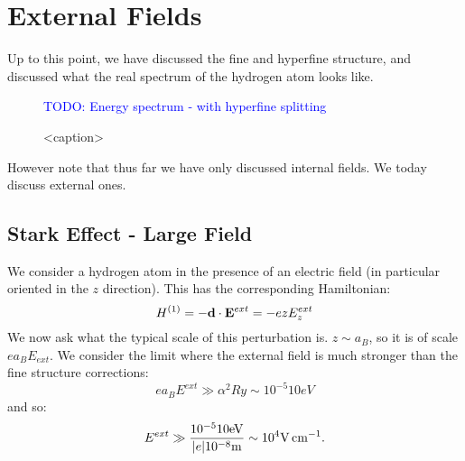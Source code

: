 \section{External Fields}
Up to this point, we have discussed the fine and hyperfine structure, and discussed what the real spectrum of the hydrogen atom looks like.

\begin{figure}[htbp]
    \centering
    \textcolor{blue}{TODO: Energy spectrum - with hyperfine splitting}
    \caption{<caption>}
    \label{<label>}
\end{figure}

However note that thus far we have only discussed internal fields. We today discuss external ones.

\subsection{Stark Effect - Large Field}
We consider a hydrogen atom in the presence of an electric field (in particular oriented in the $z$ direction). This has the corresponding Hamiltonian:
\begin{equation}
    H^{(1)} = -\v{d} \cdot \v{E}^{ext} = -ezE_z^{ext}
\end{equation}
We now ask what the typical scale of this perturbation is. $z \sim a_B$, so it is of scale $e a_B E_{ext}$. We consider the limit where the external field is much stronger than the fine structure corrections:
\begin{equation}
    e a_B E^{ext} \gg \alpha^2 \si{Ry} \sim 10^{-5} 10 \si{eV}
\end{equation}
and so:
\begin{equation}
    E^{ext} \gg \frac{ 10^{-5} 10 \si{eV}}{\abs{e}10^{-8}\si{m}} \sim 10^{4}\si{V.cm^{-1}}.
\end{equation}

